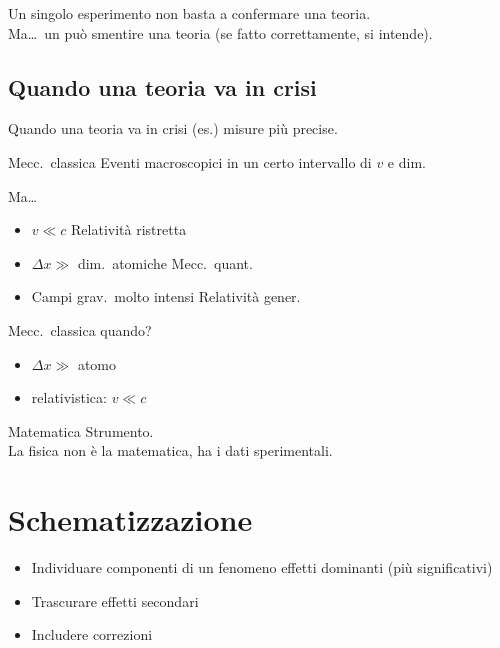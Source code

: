 \documentclass[11pt,a4paper,openany]{report}
\begin{document}
\begin{nota}
Un singolo esperimento non basta a confermare una teoria.\\
Ma\dots\ un  può smentire una teoria
(se fatto correttamente, si intende).
\end{nota}

\subsection{Quando una teoria va in crisi}
Quando una teoria va in crisi \implica (es.) misure più precise.

Mecc.\ classica \implica Eventi macroscopici in un certo intervallo di $v$ e dim.

Ma\dots
\begin{itemize}
  \item $v \ll c$ \implica Relatività ristretta
  \item $\Delta x \gg$ dim.\ atomiche \implica Mecc.\ quant.
  \item Campi grav.\ molto intensi \implica Relatività gener.
\end{itemize}

Mecc.\ classica quando?
\begin{itemize}
  \item $\Delta x \gg$ atomo
  \item relativistica: $v \ll c$
\end{itemize}

Matematica \implica Strumento.\\
La fisica non è la matematica, ha i dati sperimentali.

\section{Schematizzazione}
\begin{itemize}
  \item Individuare componenti di un fenomeno \implica effetti dominanti (più significativi)
  \item Trascurare effetti secondari
  \item Includere correzioni
\end{itemize}
\end{document}
